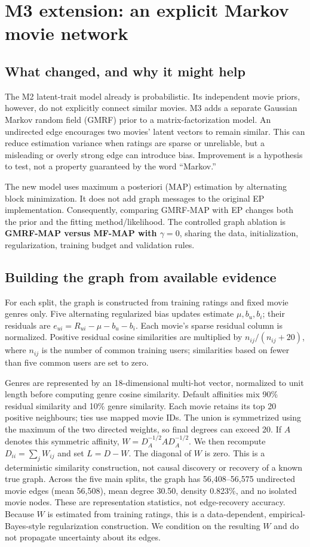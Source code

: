 \section{M3 extension: an explicit Markov movie network}
\subsection{What changed, and why it might help}
The M2 latent-trait model already is probabilistic. Its independent movie priors,
however, do not explicitly connect similar movies. M3 adds a separate Gaussian
Markov random field (GMRF) prior to a matrix-factorization model. An undirected
edge encourages two movies' latent vectors to remain similar. This can reduce
estimation variance when ratings are sparse or unreliable, but a misleading or
overly strong edge can introduce bias. Improvement is a hypothesis to test,
not a property guaranteed by the word ``Markov.''

The new model uses maximum a posteriori (MAP) estimation by alternating block
minimization. It does not add graph messages to the original EP implementation.
Consequently, comparing GMRF-MAP with EP changes both the prior and the fitting
method/likelihood. The controlled graph ablation is \textbf{GMRF-MAP versus
MF-MAP with $\gamma=0$}, sharing the data, initialization, regularization,
training budget and validation rules.

\subsection{Building the graph from available evidence}
\label{sec:graphconstruction}
For each split, the graph is constructed from training ratings and fixed movie
genres only. Five alternating regularized bias updates estimate $\mu,b_u,b_i$;
their residuals are $e_{ui}=R_{ui}-\mu-b_u-b_i$. Each movie's sparse residual
column is normalized. Positive residual cosine similarities are multiplied by
$n_{ij}/(n_{ij}+20)$, where $n_{ij}$ is the number of common training users;
similarities based on fewer than five common users are set to zero.

Genres are represented by an 18-dimensional multi-hot vector, normalized to
unit length before computing genre cosine similarity. Default affinities mix
90\% residual similarity and 10\% genre similarity. Each movie retains its top
20 positive neighbours; ties use mapped movie IDs. The union is symmetrized
using the maximum of the two directed weights, so final degrees can exceed 20.
If $A$ denotes this symmetric affinity, $W=D_A^{-1/2}AD_A^{-1/2}$.
We then recompute $D_{ii}=\sum_jW_{ij}$ and set $L=D-W$.
The diagonal of $W$ is zero. This is a deterministic similarity construction,
not causal discovery or recovery of a known true graph. Across the five main
splits, the graph has 56,408--56,575 undirected movie edges (mean 56,508),
mean degree 30.50, density 0.823\%, and no isolated movie nodes. These are
representation statistics, not edge-recovery accuracy. Because $W$ is
estimated from training ratings, this is a data-dependent, empirical-Bayes-style
regularization construction. We condition on the resulting $W$ and do not
propagate uncertainty about its edges.

